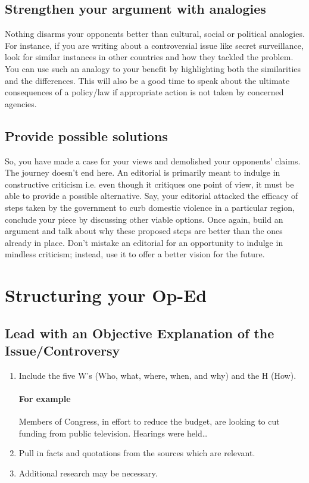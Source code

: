 \subsection{Strengthen your argument with analogies}
Nothing disarms your opponents better than cultural, social or political analogies. For instance, if you are writing about a controversial issue like secret surveillance, look for similar instances in other countries and how they tackled the problem. You can use such an analogy to your benefit by highlighting both the similarities and the differences. This will also be a good time to speak about the ultimate consequences of a policy/law if appropriate action is not taken by concerned agencies.

\subsection{Provide possible solutions}
So, you have made a case for your views and demolished your opponents' claims. The journey doesn't end here. An editorial is primarily meant to indulge in constructive criticism i.e. even though it critiques one point of view, it must be able to provide a possible alternative. Say, your editorial attacked the efficacy of steps taken by the government to curb domestic violence in a particular region, conclude your piece by discussing other viable options. Once again, build an argument and talk about why these proposed steps are better than the ones already in place. Don't mistake an editorial for an opportunity to indulge in mindless criticism; instead, use it to offer a better vision for the future.

\section{Structuring your Op-Ed}

\subsection{Lead with an Objective Explanation of the Issue/Controversy}

\begin{enumerate}
	\item Include the five W's  (Who, what, where, when, and why) and the H (How). 

\paragraph{For example}

Members of Congress, in effort to reduce the budget, are looking to cut funding from public television. Hearings were held\ldots

	\item Pull in facts and quotations from the sources which are relevant.
	\item Additional research may be necessary.
\end{enumerate}

